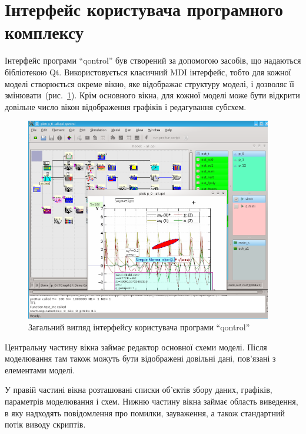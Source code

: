 




\section{Інтерфейс користувача програмного комплексу} %

Інтерфейс програми ``qontrol'' був створений за допомогою засобів,
що надаються бібліотекою Qt. Використовується класичний
MDI інтерфейс, тобто для кожної моделі створюється окреме
вікно, яке відображає структуру моделі, і дозволяє її
змінювати~(рис.~\ref{atu:f:qontrol_all}). Крім основного вікна, для кожної
моделі може бути відкрити довільне число вікон відображення
графіків і редагування субсхем.


\begin{figure}[htb!]
  \begin{center}
    \includegraphics[width=0.96\textwidth]{p/qontrol_all.png}
  \end{center}
\caption{Загальний вигляд інтерфейсу користувача програми ``qontrol''}
  \label{atu:f:qontrol_all}
\end{figure}

Центральну частину вікна займає редактор основної схеми
моделі. Після моделювання там також можуть бути відображені
довільні дані, пов'язані з елементами моделі.

У правій частині вікна розташовані списки об'єктів збору даних,
графіків, параметрів моделювання і схем. Нижню частину вікна
займає область виведення, в яку надходять повідомлення про
помилки, зауваження, а також стандартний потік виводу скриптів.



